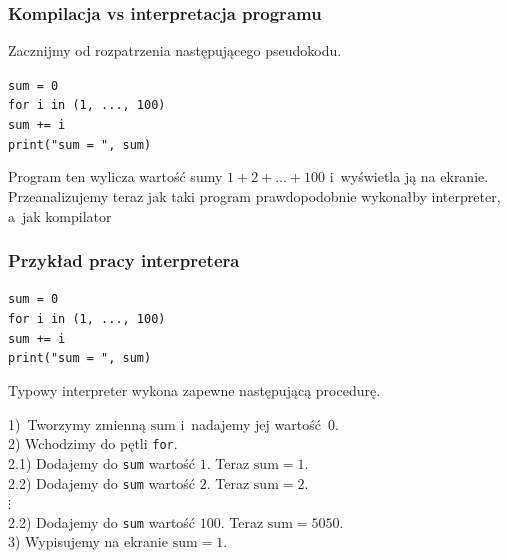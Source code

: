 \documentclass[10pt,t]{beamer}
\begin{document}
\begin{frame}
  \frametitle{Kompilacja vs interpretacja programu}


  Zacznijmy od rozpatrzenia następującego pseudokodu.

  \texttt{sum = 0} \\

  \texttt{for i in (1, ..., 100)} \\
  \hphantom{aaaa} \texttt{sum += i} \\

  \texttt{print("sum = ", sum)}

  Program ten wylicza wartość sumy $1 + 2 + \ldots + 100$ i~wyświetla ją na
  ekranie. Przeanalizujemy teraz jak taki program prawdopodobnie wykonałby
  interpreter, a~jak kompilator

\end{frame}





\begin{frame}
  \frametitle{Przykład pracy interpretera}


  \texttt{sum = 0} \\

  \texttt{for i in (1, ..., 100)} \\
  \hphantom{aaaa} \texttt{sum += i} \\

  \texttt{print("sum = ", sum)}

  Typowy interpreter wykona zapewne następującą procedurę.

  1)~Tworzymy zmienną \texttt{$\text{sum}$} i~nadajemy jej wartość~$0$. \\
  2) Wchodzimy do pętli \texttt{for}. \\
  2.1) Dodajemy do \texttt{sum} wartość $1$. Teraz $\text{sum} = 1$. \\
  2.2) Dodajemy do \texttt{sum} wartość $2$. Teraz $\text{sum} = 2$. \\
  \hphantom{aaa} $\vdots$ \\
  2.2) Dodajemy do \texttt{sum} wartość $100$. Teraz
  \texttt{$\text{sum} = 5050$}. \\
  3) Wypisujemy na ekranie \texttt{$\text{sum} = 1$}.

\end{frame}
\end{document}
